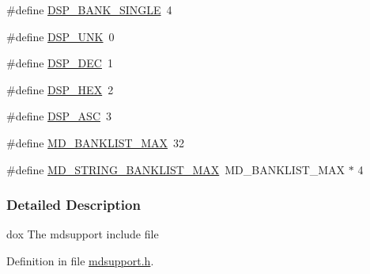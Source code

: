 \begin{DoxyCompactItemize}
\#define \hyperlink{group__mdsupportdefineh_ga818a76e5aea53754826cdf8753c5e94f}{DSP\_\-BANK\_\-SINGLE}~4
\item 
\#define \hyperlink{group__mdsupportdefineh_ga2a9aaff923e4600138cdbef43951f7c8}{DSP\_\-UNK}~0
\item 
\#define \hyperlink{group__mdsupportdefineh_ga5390ad9ba091ef1e98e36b6f090def3b}{DSP\_\-DEC}~1
\item 
\#define \hyperlink{group__mdsupportdefineh_gab656768737f9e3f933cb2929958f4832}{DSP\_\-HEX}~2
\item 
\#define \hyperlink{group__mdsupportdefineh_gaceb9fcfcef4f3ecba198a88fc503ccca}{DSP\_\-ASC}~3
\item 
\#define \hyperlink{group__mdsupportdefineh_gabe7395f9ad806d1c5695ddce6b7f2bef}{MD\_\-BANKLIST\_\-MAX}~32
\item 
\#define \hyperlink{group__mdsupportdefineh_ga25e499dd284b72f2b514e2f25f03d48b}{MD\_\-STRING\_\-BANKLIST\_\-MAX}~MD\_\-BANKLIST\_\-MAX $\ast$ 4
\end{DoxyCompactItemize}


\subsubsection{Detailed Description}
dox The mdsupport include file 

Definition in file \hyperlink{mdsupport_8h_source}{mdsupport.h}.